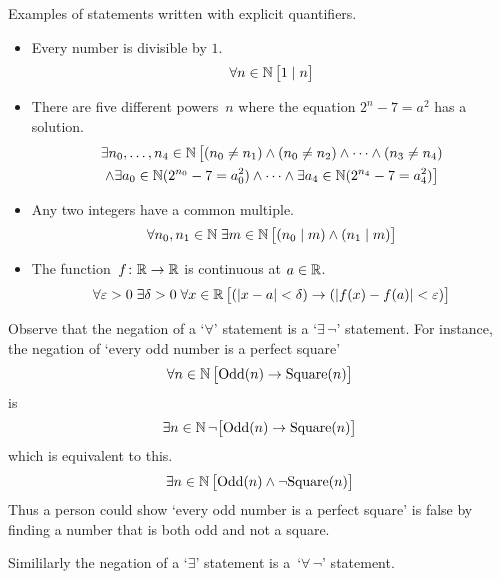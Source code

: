 \documentclass[10pt,t]{beamer}
\begin{document}
\begin{frame}
Examples of statements written with explicit quantifiers.

\begin{itemize}
\item Every number is divisible by $1$.
  \begin{equation*}
    \forall n\in\mathbb{N}\,\big[1\mid n\big]
  \end{equation*}

\pause
\item There are five different powers~$n$ where the equation $2^n-7=a^2$ has a solution.
  \begin{multline*}
    \exists n_0, \ldots, n_4\in\mathbb{N}\, \big[(n_0\neq n_1) 
                                     \wedge (n_0\neq n_2) 
                                     \wedge \cdots 
                                     \wedge (n_3\neq n_4)  \\
                                     \wedge \exists a_0\in\mathbb{N}(2^{n_0}-7=a_0^2)
                                     \wedge\cdots\wedge
                                     \exists a_4\in\mathbb{N}(2^{n_4}-7=a_4^2)\big]
  \end{multline*}

\pause
\item Any two integers have a common multiple.
  \begin{equation*}
    \forall n_0,n_1\in\mathbb{N}\;\exists m\in\mathbb{N}\,
        \big[(n_0\mid m)\wedge (n_1\mid m)\big]
  \end{equation*}

\pause
\item The function~$\mbox{$f\colon \mathbb{R}\to \mathbb{R}$}$ is continuous at $a\in\mathbb{R}$.
  \begin{equation*}
    \forall \varepsilon >0\;\exists \delta > 0\;\forall x\in\mathbb{R}\,
        \big[(\lvert x-a\rvert<\delta)\rightarrow (\lvert f(x)-f(a)\rvert<\varepsilon)\big]
  \end{equation*}
\end{itemize}
\end{frame}
\begin{frame}
Observe that the negation of a `$\forall$' statement is a `$\exists\,\neg$' 
statement.
For instance, the negation of `every odd number is a perfect square'
\begin{equation*}
  \forall n\in\mathbb{N}\,\big[ \text{Odd}(n)\rightarrow\text{Square}(n)\big]
\end{equation*}
is 
\begin{equation*}
  \exists n\in\mathbb{N}\,\neg\big[ \text{Odd}(n)\rightarrow\text{Square}(n)\big]
\end{equation*}
which is equivalent to this.
\begin{equation*}
  \exists n\in\mathbb{N}\,\big[\text{Odd}(n)\wedge\neg\text{Square}(n)\big]
\end{equation*}
Thus a person could show `every odd number is a perfect square' is false
by finding a number that is both odd and not a square.

\pause
Simililarly the negation of a `$\exists$' statement is a~`$\forall\,\neg$'
statement. 
\end{frame}
\end{document}

